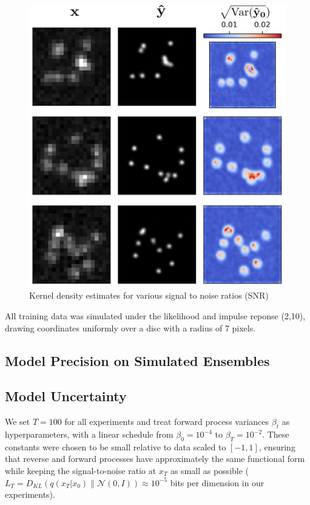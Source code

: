 \documentclass{article}
\begin{document}
\begin{figure}
\centering
\includegraphics[scale=0.8]{Samples.png}
\caption{Kernel density estimates for various signal to noise ratios (SNR)}
\end{figure}

All training data was simulated under the likelihood and impulse reponse (2,10), drawing coordinates uniformly over a disc with a radius of 7 pixels.

\subsection{Model Precision on Simulated Ensembles}

\subsection{Model Uncertainty}

We set $T = 100$ for all experiments and treat forward process variances $\beta_{t}$ as hyperparameters, with a linear schedule from $\beta_{0}=10^{-4}$ to $\beta_{T}=10^{-2}$.
These constants were chosen to be small relative to data scaled to $[-1, 1]$, ensuring that reverse and forward processes have approximately the same functional form while keeping the signal-to-noise ratio at $x_T$ as small as possible ($L_T = D_{KL}(q(x_T | x_0) \| \mathcal{N}(0, I)) \approx 10^{-5}$ bits per dimension in our experiments).
\end{document}
